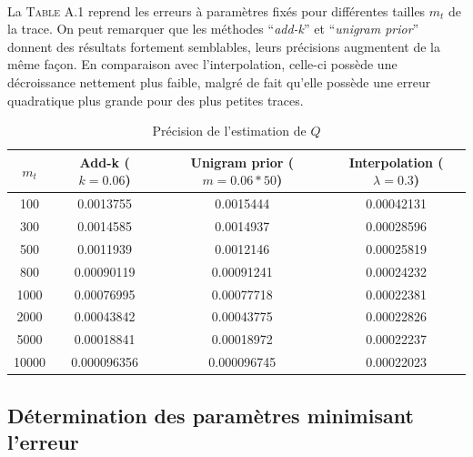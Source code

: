 \documentclass[a4paper,titlepage]{report}
\begin{document}
\paragraph{}
La \textsc{Table A.1} reprend les erreurs à paramètres fixés pour différentes tailles $m_t$ de la trace. On peut remarquer que les méthodes ``\textit{add-k}'' et ``\textit{unigram prior}'' donnent des résultats fortement semblables, leurs précisions augmentent de la même façon. En comparaison avec l'interpolation, celle-ci possède une décroissance nettement plus faible, malgré de fait qu'elle possède une erreur quadratique plus grande pour des plus petites traces. 
\begin{table}[h]
	\center
	\begin{tabular}{c|ccc}
	$m_t$ & Add-k ($k = 0.06$) & Unigram prior ($m = 0.06 * 50$) & Interpolation ($\lambda = 0.3$)\\
	\hline
	100 & \num{0.0013755} & \num{0.0015444} & \num{0.00042131}\\
	300 & \num{0.0014585} & \num{0.0014937} & \num{0.00028596}\\
	500 & \num{0.0011939} & \num{0.0012146} & \num{0.00025819}\\
	800 & \num{0.00090119} & \num{0.00091241} & \num{0.00024232}\\
	1000 & \num{0.00076995} & \num{0.00077718} & \num{0.00022381}\\
	2000 & \num{0.00043842} & \num{0.00043775} & \num{0.00022826}\\
	5000 & \num{0.00018841} & \num{0.00018972} & \num{0.00022237}\\	
	10000 & \num{0.000096356} & \num{0.000096745} & \num{0.00022023}\\	
	\end{tabular}
	\caption{Précision de l'estimation de $Q$}
	\label{tab:}
\end{table}

\subsection{Détermination des paramètres minimisant l'erreur}
\end{document}
